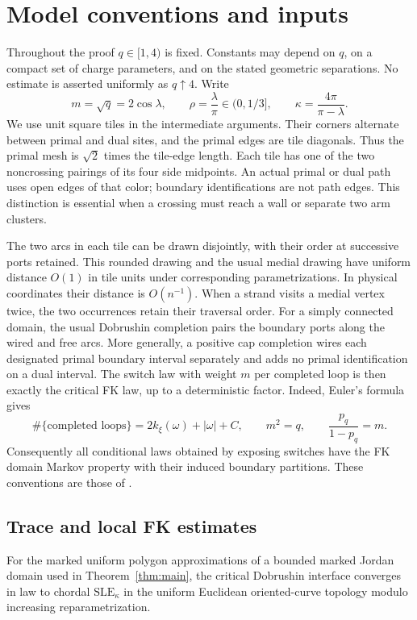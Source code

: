 \section{Model conventions and inputs}\label{sec:inputs}

Throughout the proof $q\in[1,4)$ is fixed. Constants may depend on $q$,
on a compact set of charge parameters, and on the stated geometric
separations. No estimate is asserted uniformly as $q\uparrow4$.
Write
\[
 m=\sqrt q=2\cos\lambda,\qquad
 \rho=\frac{\lambda}{\pi}\in(0,1/3],\qquad
 \kappa=\frac{4\pi}{\pi-\lambda}.
\]
We use unit square tiles in the intermediate arguments. Their corners
alternate between primal and dual sites, and the primal edges are tile
diagonals. Thus the primal mesh is $\sqrt2$ times the tile-edge length.
Each tile has one of the two noncrossing pairings of its four side
midpoints. An actual primal or dual path uses open edges of that color;
boundary identifications are not path edges. This distinction is essential
when a crossing must reach a wall or separate two arm clusters.

The two arcs in each tile can be drawn disjointly, with their order at
successive ports retained. This rounded drawing and the usual medial
drawing have uniform distance $O(1)$ in tile units under corresponding
parametrizations. In physical coordinates their distance is $O(n^{-1})$.
When a strand visits a medial vertex twice, the two occurrences retain
their traversal order. For a simply connected domain, the usual
Dobrushin completion pairs the boundary ports along the wired and free
arcs. More generally, a positive cap completion wires each designated
primal boundary interval separately and adds no primal identification
on a dual interval. The switch law with weight $m$ per completed loop
is then exactly the critical FK law, up to a deterministic factor.
Indeed, Euler's formula gives
\[
 \#\{\text{completed loops}\}=2k_\xi(\omega)+|\omega|+C,
 \qquad m^2=q,\qquad \frac{p_q}{1-p_q}=m.
\]
Consequently all conditional laws obtained by exposing switches have
the FK domain Markov property with their induced boundary partitions.
These conventions are those of \cite[Section ``Tiles, positive laws,
and localization,'' Lemma ``The positive loop law'']{FKCompanion}.

\subsection{Trace and local FK estimates}

\begin{standinginput}\label{inp:trace}
For the marked uniform polygon approximations of a bounded marked
Jordan domain used in Theorem~\ref{thm:main}, the critical Dobrushin
interface converges in law to chordal $\mathrm{SLE}_\kappa$ in the
uniform Euclidean oriented-curve topology modulo increasing
reparametrization.
\end{standinginput}

